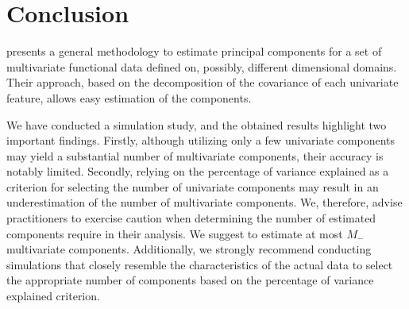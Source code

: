 
\section{Conclusion} %
\label{sec:conclusion}

\cite{happMultivariateFunctionalPrincipal2018} presents a general methodology to estimate principal components for a set of multivariate functional data defined on, possibly, different dimensional domains. Their approach, based on the decomposition of the covariance of each univariate feature, allows easy estimation of the components.

We have conducted a simulation study, and the obtained results highlight two important findings. Firstly, although utilizing only a few univariate components may yield a substantial number of multivariate components, their accuracy is notably limited. Secondly, relying on the percentage of variance explained as a criterion for selecting the number of univariate components may result in an underestimation of the number of multivariate components. We, therefore, advise practitioners to exercise caution when determining the number of estimated components require in their analysis. We suggest to estimate at most $M_{-}$ multivariate components. Additionally, we strongly recommend conducting simulations that closely resemble the characteristics of the actual data to select the appropriate number of components based on the percentage of variance explained criterion.






